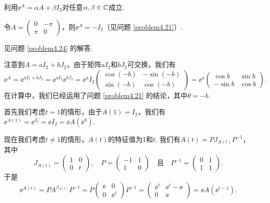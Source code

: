 \begin{solution}
  \begin{inparaenum}[(a)]
    \item 利用$\ee^A=\alpha A+\beta I_2$对任意$\alpha,\beta\in\mathbb C$成立.

    \item 令$A=\begin{pmatrix}
      0 & -\pi \\
      \pi & 0
    \end{pmatrix}$，则$\ee^A=-I_2$（见问题 \ref{problem4.21}）.
  \end{inparaenum}
\end{solution}

\begin{solution}
  见问题 \ref{problem4.24} 的解答.
\end{solution}

\begin{solution}
  注意到$A=aI_2+bJ_2$，由于矩阵$aI_2$和$bJ_2$可交换，我们有
  \[
    \ee^A = \ee^{aI_2+bJ_2} = \ee^{aI_2}\ee^{bJ_2} = \ee^aI_2\begin{pmatrix}
      \cos(-b) & - \sin(-b) \\
      \sin(-b) & \cos(-b)
    \end{pmatrix} = \ee^a \begin{pmatrix}
      \cos b & \sin b \\
      -\sin b & \cos b
    \end{pmatrix}.
  \]
  在计算中，我们已经运用了问题 \ref{problem4.21} 的结论，其中$\theta=-b$.
\end{solution}

\begin{solution}
  首先我们考虑$t=1$的情形，由于$A(1)=I_2$，我们有$\ee^{A(1)}=\ee^{I_2}=\ee I_2=\ee A(\ee^0)$.

  现在我们考虑$t\ne1$的情形，$A(t)$的特征值为1和$t$. 我们有$A(t)=PJ_{A(t)}P^{-1}$，其中
  \[
    J_{A(t)} = \begin{pmatrix}
      1 & 0 \\
      0 & t
    \end{pmatrix}, \quad P = \begin{pmatrix}
      -1 & 1 \\
      1 & 0
    \end{pmatrix} \quad \text{且} \quad
    P^{-1} = \begin{pmatrix}
      0 & 1 \\
      1 & 1
    \end{pmatrix}.
  \]
  于是
  \[
    \ee^{A(t)} = PA^{J_{A(t)}}P^{-1} = P \begin{pmatrix}
      \ee & 0 \\
      0 & \ee^t
    \end{pmatrix} P^{-1} = \begin{pmatrix}
      \ee^t & \ee^t - \ee \\
      0 & \ee
    \end{pmatrix} = \ee A(\ee^{t-1}).
  \]
\end{solution}

